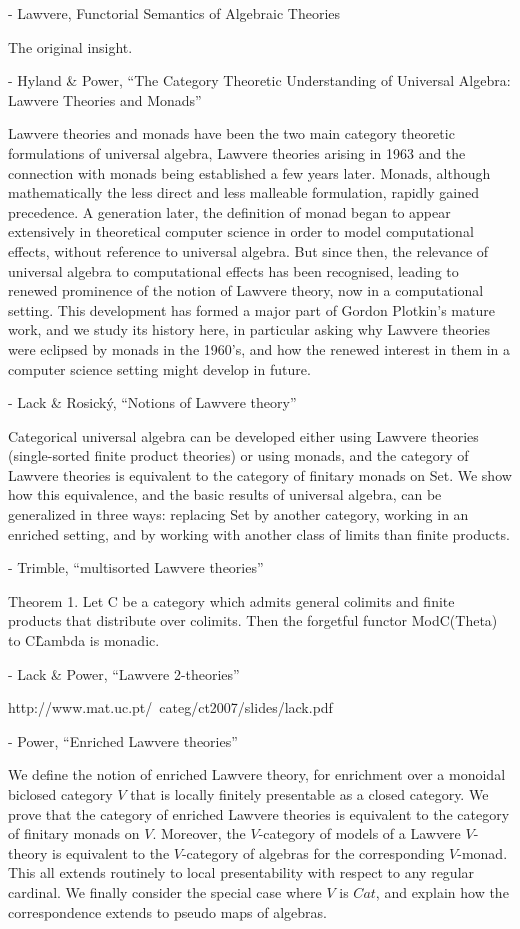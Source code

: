 \documentclass{article}
\begin{document}
- Lawvere, Functorial Semantics of Algebraic Theories

The original insight.

- Hyland \& Power, ``The Category Theoretic Understanding of Universal Algebra: Lawvere Theories and Monads''

  Lawvere theories and monads have been the two main category theoretic formulations of universal algebra, Lawvere theories arising in 1963 and the connection with monads being established a few years later. Monads, although mathematically the less direct and less malleable formulation, rapidly gained precedence. A generation later, the definition of monad began to appear extensively in theoretical computer science in order to model computational effects, without reference to universal algebra. But since then, the relevance of universal algebra to computational effects has been recognised, leading to renewed prominence of the notion of Lawvere theory, now in a computational setting. This development has formed a major part of Gordon Plotkin’s mature work, and we study its history here, in particular asking why Lawvere theories were eclipsed by monads in the 1960’s, and how the renewed interest in them in a computer science setting might develop in future.

- Lack \& Rosick\'y, ``Notions of Lawvere theory''

  Categorical universal algebra can be developed either using Lawvere theories (single-sorted finite product theories) or using monads, and the category of Lawvere theories is equivalent to the category of finitary monads on Set. We show how this equivalence, and the basic results of universal algebra, can be generalized in three ways: replacing Set by another category, working in an enriched setting, and by working with another class of limits than finite products.
  
- Trimble, ``multisorted Lawvere theories''

  Theorem 1. Let C be a category which admits general colimits and finite products that distribute over colimits. Then the forgetful functor ModC(Theta) to C\^Lambda is monadic.

- Lack \& Power, ``Lawvere 2-theories''

  http://www.mat.uc.pt/~categ/ct2007/slides/lack.pdf

- Power, ``Enriched Lawvere theories''

  We define the notion of enriched Lawvere theory, for enrichment over a monoidal biclosed category $V$ that is locally finitely presentable as a closed category. We prove that the category of enriched Lawvere theories is equivalent to the category of finitary monads on $V$. Moreover, the $V$-category of models of a Lawvere $V$-theory is equivalent to the $V$-category of algebras for the corresponding $V$-monad. This all extends routinely to local presentability with respect to any regular cardinal. We finally consider the special case where $V$ is $Cat$, and explain how the correspondence extends to pseudo maps of algebras.
\end{document}
